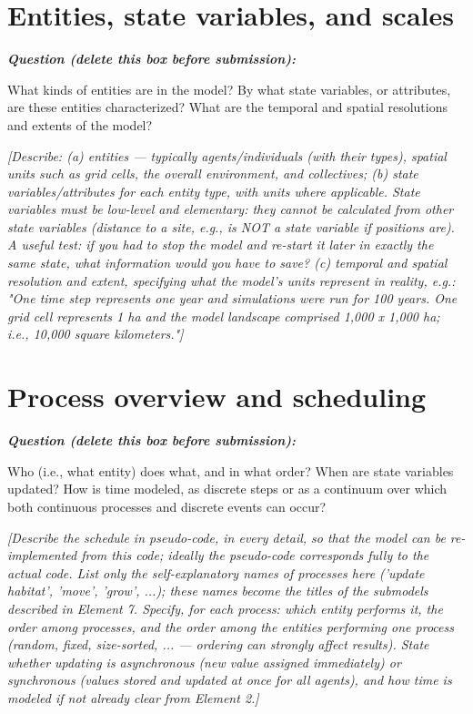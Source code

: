 \documentclass[11pt,a4paper]{article}
\newenvironment{question}
  {\begin{oddquestion}\small\itshape\color{oddquestioncolor}%
   \textbf{Question (delete this box before submission):}\par\smallskip}
  {\end{oddquestion}}
\begin{document}
\section{Entities, state variables, and scales}
\begin{question}
What kinds of entities are in the model? By what state variables, or
attributes, are these entities characterized? What are the temporal and
spatial resolutions and extents of the model?
\end{question}
\textit{[Describe: (a) entities — typically agents/individuals (with
their types), spatial units such as grid cells, the overall environment,
and collectives; (b) state variables/attributes for each entity type,
with units where applicable. State variables must be low-level and
elementary: they cannot be calculated from other state variables
(distance to a site, e.g., is NOT a state variable if positions are).
A useful test: if you had to stop the model and re-start it later in
exactly the same state, what information would you have to save?
(c) temporal and spatial resolution and extent, specifying what the
model's units represent in reality, e.g.: "One time step represents one
year and simulations were run for 100 years. One grid cell represents
1 ha and the model landscape comprised 1,000 x 1,000 ha; i.e., 10,000
square kilometers."]}


\section{Process overview and scheduling}
\begin{question}
Who (i.e., what entity) does what, and in what order? When are state
variables updated? How is time modeled, as discrete steps or as a
continuum over which both continuous processes and discrete events can
occur?
\end{question}
\textit{[Describe the schedule in pseudo-code, in every detail, so that
the model can be re-implemented from this code; ideally the pseudo-code
corresponds fully to the actual code. List only the self-explanatory
names of processes here ('update habitat', 'move', 'grow', ...); these
names become the titles of the submodels described in Element 7.
Specify, for each process: which entity performs it, the order among
processes, and the order among the entities performing one process
(random, fixed, size-sorted, ... — ordering can strongly affect results).
State whether updating is asynchronous (new value assigned immediately)
or synchronous (values stored and updated at once for all agents), and
how time is modeled if not already clear from Element 2.]}
\end{document}
